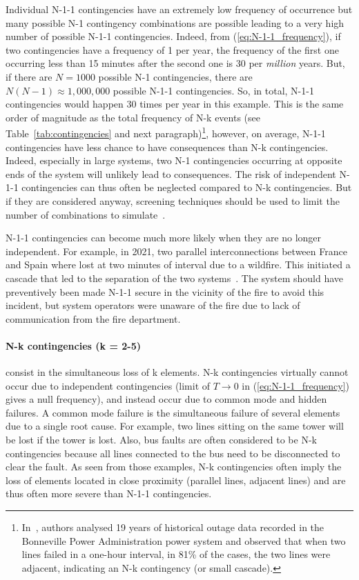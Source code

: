 Individual N-1-1 contingencies have an extremely low frequency of occurrence but many possible N-1 contingency combinations are possible leading to a very high number of possible N-1-1 contingencies. Indeed, from (\ref{eq:N-1-1_frequency}), if two contingencies have a frequency of 1 per year, the frequency of the first one occurring less than 15 minutes after the second one is 30 per \emph{million} years. But, if there are \(N = 1000\) possible N-1 contingencies, there are \(N(N-1) \approx 1,000,000\) possible N-1-1 contingencies. So, in total, N-1-1 contingencies would happen 30 times per year in this example. This is the same order of magnitude as the total frequency of N-k events (see Table~\ref{tab:contingencies} and next paragraph)\footnote{In~\cite{ContingencyMotifs}, authors analysed 19 years of historical outage data recorded in the Bonneville Power Administration power system and observed that when two lines failed in a one-hour interval, in 81\% of the cases, the two lines were adjacent, indicating an N-k contingency (or small cascade).}, however, on average, N-1-1 contingencies have less chance to have consequences than N-k contingencies. Indeed, especially in large systems, two N-1 contingencies occurring at opposite ends of the system will unlikely lead to consequences. The risk of independent N-1-1 contingencies can thus often be neglected compared to N-k contingencies. But if they are considered anyway, screening techniques should be used to limit the number of combinations to simulate~\cite{VittalN-1-1}.

N-1-1 contingencies can become much more likely when they are no longer independent. For example, in 2021, two parallel interconnections between France and Spain where lost at two minutes of interval due to a wildfire. This initiated a cascade that led to the separation of the two systems~\cite{ENTSOEIbericSplit2021}. The system should have preventively been made N-1-1 secure in the vicinity of the fire to avoid this incident, but system operators were unaware of the fire due to lack of communication from the fire department.


\paragraph*{N-k contingencies (k = 2-5)} consist in the simultaneous loss of k elements. N-k contingencies virtually cannot occur due to independent contingencies (limit of \(T \to 0\) in (\ref{eq:N-1-1_frequency}) gives a null frequency), and instead occur due to common mode and hidden failures. A common mode failure is the simultaneous failure of several elements due to a single root cause. For example, two lines sitting on the same tower will be lost if the tower is lost. Also, bus faults are often considered to be N-k contingencies because all lines connected to the bus need to be disconnected to clear the fault. As seen from those examples, N-k contingencies often imply the loss of elements located in close proximity (parallel lines, adjacent lines) and are thus often more severe than N-1-1 contingencies.

